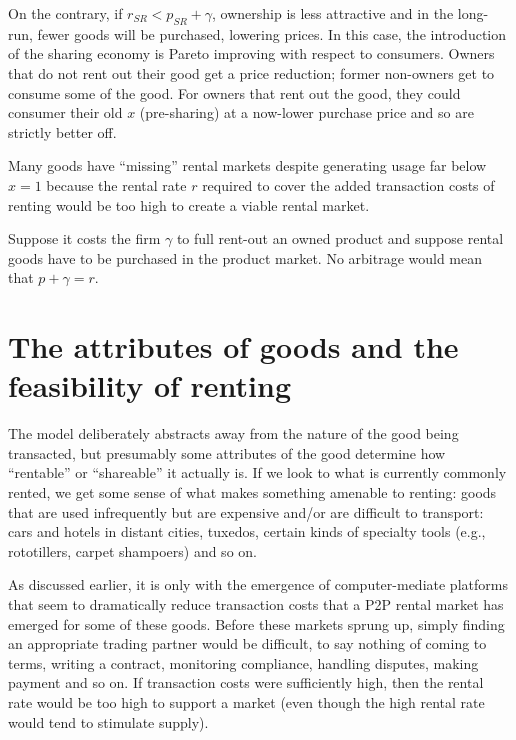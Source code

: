 \documentclass[11pt]{article}
\begin{document}
On the contrary, if $r_{SR} < p_{SR} + \gamma$, ownership is less attractive and in the long-run, fewer goods will be purchased, lowering prices. 
In this case, the introduction of the sharing economy is Pareto improving with respect to consumers. 
Owners that do not rent out their good get a price reduction; former non-owners get to consume some of the good. 
For owners that rent out the good, they could consumer their old $x$ (pre-sharing) at a now-lower purchase price and so are strictly better off. 

Many goods have ``missing'' rental markets despite generating usage far below $x = 1$ because the rental rate $r$ required to cover the added transaction costs of renting would be too high to create a viable rental market. 

Suppose it costs the firm $\gamma$ to full rent-out an owned product and suppose rental goods have to be purchased in the product market. 
No arbitrage would mean that $p + \gamma = r$. 

\section{The attributes of goods and the feasibility of renting} 

The model deliberately abstracts away from the nature of the good being transacted, but presumably some attributes of the good determine how ``rentable''  or ``shareable'' it actually is. 
If we look to what is currently commonly rented, we get some sense of what makes something amenable to renting:  
goods that are used infrequently but are expensive and/or are difficult to transport: 
cars and hotels in distant cities, tuxedos, certain kinds of specialty tools (e.g., rototillers, carpet shampoers) and so on. 

As discussed earlier, it is only with the emergence of computer-mediate platforms that seem to dramatically reduce transaction costs that a P2P rental market has emerged for some of these goods. 
Before these markets sprung up, simply finding an appropriate trading partner would be difficult, to say nothing of coming to terms, writing a contract, monitoring compliance, handling disputes, making payment and so on. 
If transaction costs were sufficiently high, then the rental rate would be too high to support a market (even though the high rental rate would tend to stimulate supply). 
\end{document}

